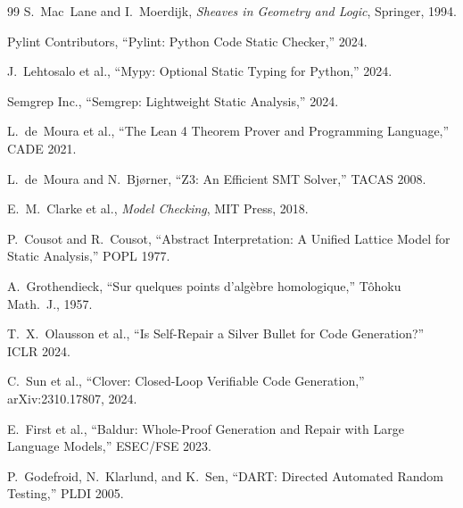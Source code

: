 \documentclass[11pt]{article}
\begin{document}
\begin{thebibliography}{99}
S.~Mac~Lane and I.~Moerdijk, \emph{Sheaves in Geometry and Logic},
Springer, 1994.

Pylint Contributors, ``Pylint: Python Code Static Checker,'' 2024.

J.~Lehtosalo et al., ``Mypy: Optional Static Typing for Python,'' 2024.

Semgrep Inc., ``Semgrep: Lightweight Static Analysis,'' 2024.

L.~de~Moura et al., ``The Lean 4 Theorem Prover and Programming
Language,'' CADE 2021.

L.~de~Moura and N.~Bj{\o}rner, ``Z3: An Efficient SMT Solver,''
TACAS 2008.

E.~M.~Clarke et al., \emph{Model Checking}, MIT Press, 2018.

P.~Cousot and R.~Cousot, ``Abstract Interpretation: A Unified Lattice
Model for Static Analysis,'' POPL 1977.

A.~Grothendieck, ``Sur quelques points d'alg\`ebre homologique,''
T\^ohoku Math.\ J., 1957.

T.~X.~Olausson et al., ``Is Self-Repair a Silver Bullet for Code
Generation?'' ICLR 2024.

C.~Sun et al., ``Clover: Closed-Loop Verifiable Code Generation,''
arXiv:2310.17807, 2024.

E.~First et al., ``Baldur: Whole-Proof Generation and Repair with
Large Language Models,'' ESEC/FSE 2023.

P.~Godefroid, N.~Klarlund, and K.~Sen, ``DART: Directed Automated
Random Testing,'' PLDI 2005.

\end{thebibliography}
\end{document}
